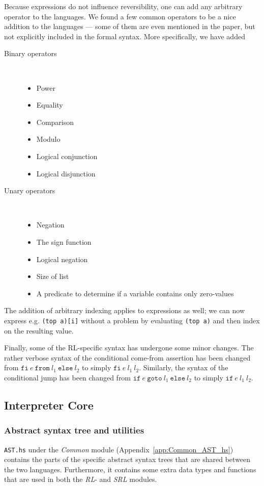 Because expressions do not influence reversibility, one can add any arbitrary operator to the languages. We found a few common operators to be a nice addition to the languages --- some of them are even mentioned in the paper, but not explicitly included in the formal syntax. More specifically, we have added
\begin{description}
\item[Binary operators]~
  \begin{itemize}
  \item Power
  \item Equality
  \item Comparison
  \item Modulo
  \item Logical conjunction
  \item Logical disjunction
\end{itemize}
\item[Unary operators]~
\begin{itemize}
  \item Negation
  \item The sign function
  \item Logical negation
  \item Size of list
  \item A predicate to determine if a variable contains only zero-values
\end{itemize}
\end{description}
The addition of arbitrary indexing applies to expressions as well; we can now express e.g. \texttt{(top a)[i]} without a problem by evaluating \texttt{(top a)} and then index on the resulting value.

Finally, some of the RL-specific syntax has undergone some minor changes. The rather verbose syntax of the conditional come-from assertion has been changed from $\texttt{fi} \ e \ \texttt{from} \ l_1 \ \texttt{else} \ l_2$ to simply $\texttt{fi} \ e \ l_1 \ l_2$. Similarly, the syntax of the conditional jump has been changed from $\texttt{if} \ e \ \texttt{goto} \ l_1 \ \texttt{else} \ l_2$ to simply $\texttt{if} \ e \ l_1 \ l_2$.

\subsection{Interpreter Core}

\subsubsection{Abstract syntax tree and utilities}
\texttt{AST.hs} under the \textit{Common} module (Appendix~\ref{app:Common_AST_hs}) contains the parts of the specific abstract syntax trees that are shared between the two languages. Furthermore, it contains some extra data types and functions that are used in both the \textit{RL}- and \textit{SRL} modules.

